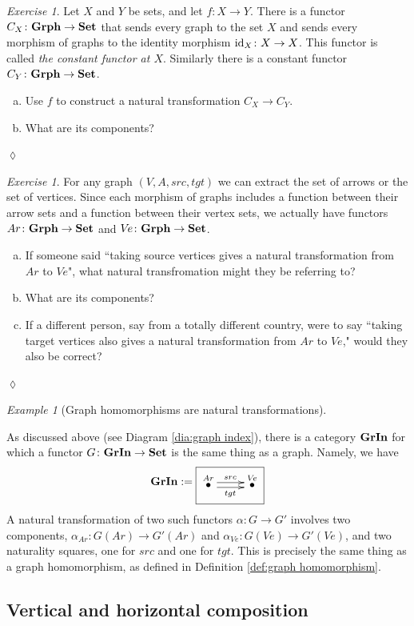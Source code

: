 \documentclass{book}
\makeatletter
\def\tn{\textnormal}
\def\to{\rightarrow}
\def\taking{\colon}
\newcommand{\LMO}[1]{\stackrel{#1}{\bullet}}
\def\id{\tn{id}}
\def\Grph{{\bf Grph}}
\def\Set{{\bf Set}}
\theoremstyle{remark}
\newtheorem{example}[subsubsection]{Example}
\newtheorem{exc}[subsubsection]{Exercise}
\newenvironment{exercise}{\begin{exc}}{\hspace*{\fill}$\lozenge$\end{exc}}
\theoremstyle{definition}
\def\GrIn{{\bf GrIn}}
\def\GrInSchema{\xymatrix{\LMO{Ar}\ar@<.5ex>[r]^{src}\ar@<-.5ex>[r]_{tgt}&\LMO{V\!e}}}
\def\sexc{\begin{enumerate}[a.)]\setlength{\itemsep}{.1cm}\setlength{\parskip}{.1cm}\item}
\def\next{\item}
\def\endsexc{\end{enumerate}}
\makeatother
\begin{document}
\begin{exercise}
Let $X$ and $Y$ be sets, and let $f\taking X\to Y$. There is a functor $C_X\taking\Grph\to\Set$ that sends every graph to the set $X$ and sends every morphism of graphs to the identity morphism $\id_X\taking X\to X$. This functor is called {\em the constant functor at $X$}. Similarly there is a constant functor $C_Y\taking\Grph\to\Set$.
\sexc Use $f$ to construct a natural transformation $C_X\to C_Y$.
\next What are its components?
\endsexc
\end{exercise}

\begin{exercise}
For any graph $(V,A,src,tgt)$ we can extract the set of arrows or the set of vertices. Since each morphism of graphs includes a function between their arrow sets and a function between their vertex sets, we actually have functors $Ar\taking\Grph\to\Set$\index{a functor!$\Grph\to\Set$} and $V\!e\taking\Grph\to\Set$.
\sexc If someone said ``taking source vertices gives a natural transformation from $Ar$ to $V\!e$", what natural transfromation might they be referring to?
\next What are its components? 
\next If a different person, say from a totally different country, were to say ``taking target vertices also gives a natural transformation from $Ar$ to $V\!e$," would they also be correct?
\endsexc
\end{exercise}

\begin{example}[Graph homomorphisms are natural transformations]\label{ex:graph hom as NT}

As discussed above (see Diagram \ref{dia:graph index}), there is a category $\GrIn$ for which a functor $G\taking\GrIn\to\Set$ is the same thing as a graph. Namely, we have 
\begin{align*}
\GrIn:=\fbox{\GrInSchema}
\end{align*}
A natural transformation of two such functors $\alpha\taking G\to G'$ involves two components, $\alpha_{Ar}\taking G(Ar)\to G'(Ar)$ and $\alpha_{V\!e}\taking G(V\!e)\to G'(V\!e)$, and two naturality squares, one for $src$ and one for $tgt$. This is precisely the same thing as a graph homomorphism, as defined in Definition \ref{def:graph homomorphism}.

\end{example}


\subsection{Vertical and horizontal composition}\label{sec:vert and hor}
\end{document}
